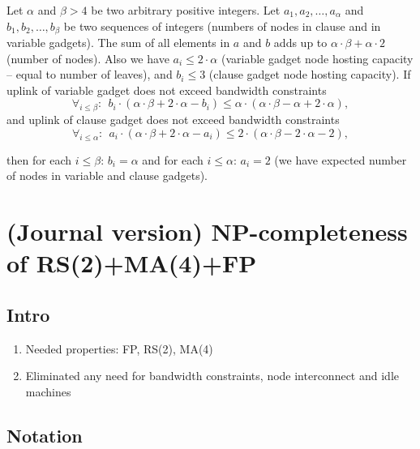 \documentclass[conference,10pt]{IEEEtran}
\newcommand{\maciek}[1]{\textcolor{brown}{maciek: #1}}
\newcommand{\clauses}{\alpha}
\newcommand{\variables}{\beta}
\begin{document}
\begin{lemma}\label{lem:bandwidth-lemma-extended}
  Let $\clauses$ and $\variables > 4$ be two arbitrary positive integers. Let $a_1, a_2, \ldots,
  a_{\clauses}$ and $b_1, b_2, \ldots,
  b_{\variables}$ be two sequences of integers (numbers of nodes in clause and 
in variable gadgets). The sum of all elements in $a$ and $b$ adds up to
  $\clauses \cdot \variables + \clauses \cdot 2$ (number of nodes). Also
  we have $a_i \leq 2 \cdot \clauses$
  (variable gadget node hosting capacity -- equal to number of leaves),
  and $b_i \leq 3$ (clause gadget node hosting capacity). If uplink of variable 
gadget does not exceed bandwidth constraints
  $$ \forall_{i\leq\variables}:~~ b_i \cdot (\clauses \cdot \variables
  + 2\cdot \clauses- b_i) \leq \clauses \cdot (\clauses \cdot \variables -
  \clauses + 2 \cdot \clauses), $$
and uplink of clause gadget does not exceed bandwidth constraints
$$ \forall_{i\leq\clauses}:~~ a_i \cdot (\clauses \cdot \variables + 2 \cdot \clauses - a_i) \leq 2 \cdot (\clauses \cdot \variables -
  2 \cdot \clauses - 2), $$

\noindent  then for each $i\leq \variables$: $b_i = \clauses$ and for
each $i\leq\clauses$: $a_i = 2$ (we have expected number of nodes in variable 
and clause gadgets).
\end{lemma}

\section{(Journal version) NP-completeness of RS(2)+MA(4)+FP}

\subsection{Intro}

\begin{enumerate}
  \item Needed properties: FP, RS(2), MA(4)
  \item Eliminated any need for bandwidth constraints, node interconnect and idle machines
\end{enumerate}

\subsection{Notation}
\end{document}
